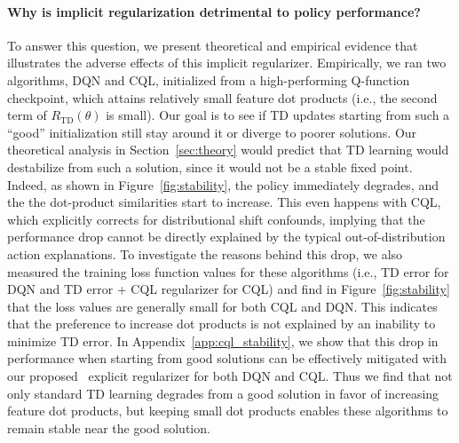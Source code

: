 \paragraph{Why is implicit regularization detrimental to policy performance?}
To answer this question, we present theoretical and empirical evidence that illustrates the adverse effects of this implicit regularizer. Empirically, we ran two algorithms, DQN and CQL, initialized from a high-performing Q-function checkpoint,
which attains relatively small feature dot products (i.e., the second term of $R_\mathrm{TD}(\theta)$ is small). Our goal is to see if TD updates starting from such a ``good'' initialization still stay around it or diverge to poorer solutions. Our theoretical analysis in Section~\ref{sec:theory} would predict that TD learning would destabilize from such a solution, since it would not be a stable fixed point. Indeed, as shown in Figure~\ref{fig:stability}, the policy immediately degrades, and the the dot-product similarities start to increase. This even happens with CQL, which explicitly corrects for distributional shift confounds, implying that the performance drop cannot be directly explained by the typical out-of-distribution action explanations. To investigate the reasons behind this drop, we also measured the training loss function values for these algorithms (i.e., TD error for DQN and TD error + CQL regularizer for CQL) and find in Figure~\ref{fig:stability} that the loss values are generally small for both CQL and DQN. This indicates that the preference to increase dot products is not explained by an inability to minimize TD error. 
In Appendix~\ref{app:cql_stability}, we show that this drop in performance when starting from good solutions can be effectively mitigated with our proposed \methodname\ explicit regularizer for both DQN and CQL. Thus we find that not only standard TD learning degrades from a good solution in favor of increasing feature dot products, but keeping small dot products enables these algorithms to remain stable near the good solution.

